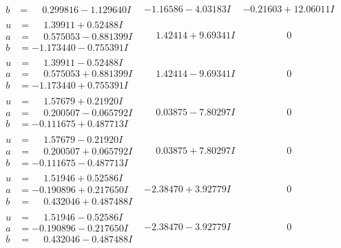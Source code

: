 \documentclass[1p]{elsarticle_modified}
\theoremstyle{definition}
\begin{document}
$$\begin{array}{c|c|c}
\begin{aligned}
b &= \phantom{-}0.299816 - 1.129640 I\end{aligned}
 & -1.16586 - 4.03183 I & -0.21603 + 12.06011 I \\ \hline\begin{aligned}
u &= \phantom{-}1.39911 + 0.52488 I \\
a &= \phantom{-}0.575053 - 0.881399 I \\
b &= -1.173440 - 0.755391 I\end{aligned}
 & \phantom{-}1.42414 + 9.69341 I & \phantom{-0.000000 } 0 \\ \hline\begin{aligned}
u &= \phantom{-}1.39911 - 0.52488 I \\
a &= \phantom{-}0.575053 + 0.881399 I \\
b &= -1.173440 + 0.755391 I\end{aligned}
 & \phantom{-}1.42414 - 9.69341 I & \phantom{-0.000000 } 0 \\ \hline\begin{aligned}
u &= \phantom{-}1.57679 + 0.21920 I \\
a &= \phantom{-}0.200507 - 0.065792 I \\
b &= -0.111675 + 0.487713 I\end{aligned}
 & \phantom{-}0.03875 - 7.80297 I & \phantom{-0.000000 } 0 \\ \hline\begin{aligned}
u &= \phantom{-}1.57679 - 0.21920 I \\
a &= \phantom{-}0.200507 + 0.065792 I \\
b &= -0.111675 - 0.487713 I\end{aligned}
 & \phantom{-}0.03875 + 7.80297 I & \phantom{-0.000000 } 0 \\ \hline\begin{aligned}
u &= \phantom{-}1.51946 + 0.52586 I \\
a &= -0.190896 + 0.217650 I \\
b &= \phantom{-}0.432046 + 0.487488 I\end{aligned}
 & -2.38470 + 3.92779 I & \phantom{-0.000000 } 0 \\ \hline\begin{aligned}
u &= \phantom{-}1.51946 - 0.52586 I \\
a &= -0.190896 - 0.217650 I \\
b &= \phantom{-}0.432046 - 0.487488 I\end{aligned}
 & -2.38470 - 3.92779 I & \phantom{-0.000000 } 0 \\ \hline\begin{aligned}

\end{aligned}
\end{array}$$
\end{document}
